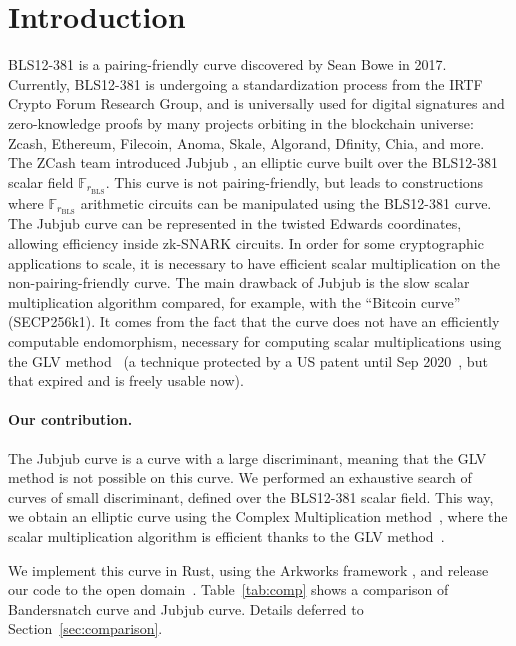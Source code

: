 \documentclass[smallextended]{svjour3}
\begin{document}
\section{Introduction}
BLS12-381 is a pairing-friendly curve discovered by Sean
Bowe \cite{bls12381} in 2017.
Currently, BLS12-381 is undergoing a standardization process 
from the
IRTF Crypto Forum Research Group, and is
universally used for digital
signatures and zero-knowledge proofs by many projects orbiting in the
blockchain universe: Zcash, Ethereum, Filecoin, Anoma, Skale, Algorand, Dfinity,
Chia, and more.
The ZCash team
introduced Jubjub \cite{jubjub}, an
elliptic curve built over the BLS12-381 scalar field $\mathbb
F_{r_\text{BLS}}$.
This curve is not pairing-friendly, but leads to constructions where
$\mathbb F_{r_\text{BLS}}$ arithmetic circuits can be manipulated
using the BLS12-381 curve.
The Jubjub curve can be represented in the twisted Edwards
coordinates, allowing efficiency inside zk-SNARK circuits.
In order for some cryptographic applications to scale, it is necessary to
have efficient scalar multiplication on the non-pairing-friendly
curve.
The main drawback of Jubjub is the slow scalar multiplication
algorithm compared, for example, with the ``Bitcoin curve''
(SECP256k1).
It comes from the fact that the curve does not have an efficiently
computable endomorphism, necessary for computing scalar
multiplications using the GLV method~\cite{C:GalLamVan01} (a technique
protected by a US patent until Sep 2020~\cite{glvpatent}, but that 
expired and is
freely usable now).

\paragraph{Our contribution.}
The Jubjub curve is a curve with a large discriminant, meaning that
the GLV method is not possible on this curve.
We performed an exhaustive search of curves of small discriminant,
defined over the BLS12-381 scalar field. This way, we obtain an
elliptic curve using the Complex Multiplication
method~\cite{MC:AtkMor93}, where the scalar multiplication algorithm
is efficient thanks to the GLV method~\cite{C:GalLamVan01}.

We implement this curve in Rust, using
the {Arkworks framework} \cite{arkworks}, and release our
code to the open domain~\cite{bandersnatch-rust}.
Table~\ref{tab:comp} shows a comparison of Bandersnatch curve
and Jubjub curve. 
Details deferred to Section~\ref{sec:comparison}.
\end{document}
